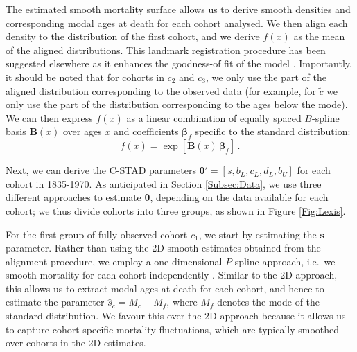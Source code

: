 \documentclass[11pt, a4paper]{article}
\begin{document}
The estimated smooth mortality surface allows us to derive smooth densities and corresponding modal ages at death for each cohort analysed. We then align each density to the distribution of the first cohort, and we derive $f(x)$ as the mean of the aligned distributions. This landmark registration procedure has been suggested elsewhere as it enhances the goodness-of fit of the model \cite[for additional details, see][]{basellini2019modeling}. Importantly, it should be noted that for cohorts in $c_2$ and $c_3$, we only use the part of the aligned distribution corresponding to the observed data (for example, for $\tilde{c}$ we only use the part of the distribution corresponding to the ages below the mode). We can then express $f(x)$ as a linear combination of equally spaced $B$-spline basis $\bm{B}(x)$ over ages $x$ and coefficients $\bm{\beta}_{f}$ specific to the standard distribution:
\begin{equation}\label{Eq:standPsplines}
f(x) = \exp\left[ \bm{B}(x) \, \bm{\beta}_{f} \right] \, .
\end{equation} \par

Next, we can derive the C-STAD parameters $\bm{\theta}'=\left[s,b_{L},c_{L},d_{L},b_{U}\right]$ for each cohort in 1835-1970. As anticipated in Section \ref{Subsec:Data}, we use three different approaches to estimate $\bm{\theta}$, depending on the data available for each cohort; we thus divide cohorts into three groups, as shown in Figure \ref{Fig:Lexis}. \par

For the first group of fully observed cohort $c_1$, we start by estimating the $\bm{s}$ parameter. Rather than using the 2D smooth estimates obtained from the alignment procedure, we employ a one-dimensional $P$-spline approach, i.e.~we smooth mortality for each cohort independently \cite[as typically done in period analyses, see, for example,][]{ouellette2011changes}. Similar to the 2D approach, this allows us to extract modal ages at death for each cohort, and hence to estimate the parameter $\hat{s}_c=M_c - M_f$, where $M_f$ denotes the mode of the standard distribution. We favour this over the 2D approach because it allows us to capture cohort-specific mortality fluctuations, which are typically smoothed over cohorts in the 2D estimates. \par
\end{document}
